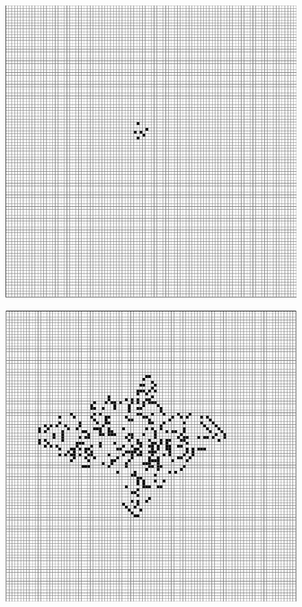 \documentclass[12pt] {article}
\begin{document}
\begin{figure}[H]
    \begin{minipage}[t]{.3\textwidth}
        \centering
        \includegraphics[width=\textwidth]{res/seeds_1.png}
        \label{fig:seeds1}
    \end{minipage}
    \hfill
    \begin{minipage}[t]{.3\textwidth}
        \centering
        \includegraphics[width=\textwidth]{res/seeds_40.png}

\end{minipage}
\end{figure}
\end{document}
